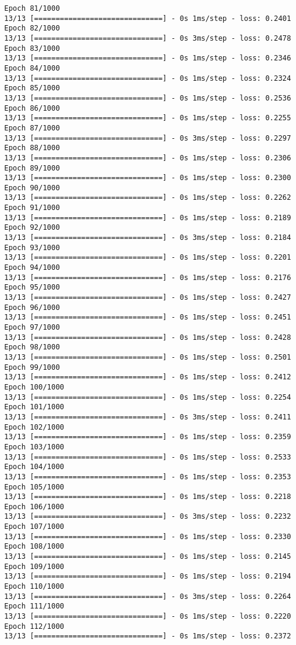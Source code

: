 \documentclass[11pt]{article}
\begin{document}
\begin{Verbatim}[commandchars=\\\{\}]
Epoch 81/1000
13/13 [==============================] - 0s 1ms/step - loss: 0.2401
Epoch 82/1000
13/13 [==============================] - 0s 3ms/step - loss: 0.2478
Epoch 83/1000
13/13 [==============================] - 0s 1ms/step - loss: 0.2346
Epoch 84/1000
13/13 [==============================] - 0s 1ms/step - loss: 0.2324
Epoch 85/1000
13/13 [==============================] - 0s 1ms/step - loss: 0.2536
Epoch 86/1000
13/13 [==============================] - 0s 1ms/step - loss: 0.2255
Epoch 87/1000
13/13 [==============================] - 0s 3ms/step - loss: 0.2297
Epoch 88/1000
13/13 [==============================] - 0s 1ms/step - loss: 0.2306
Epoch 89/1000
13/13 [==============================] - 0s 1ms/step - loss: 0.2300
Epoch 90/1000
13/13 [==============================] - 0s 1ms/step - loss: 0.2262
Epoch 91/1000
13/13 [==============================] - 0s 1ms/step - loss: 0.2189
Epoch 92/1000
13/13 [==============================] - 0s 3ms/step - loss: 0.2184
Epoch 93/1000
13/13 [==============================] - 0s 1ms/step - loss: 0.2201
Epoch 94/1000
13/13 [==============================] - 0s 1ms/step - loss: 0.2176
Epoch 95/1000
13/13 [==============================] - 0s 1ms/step - loss: 0.2427
Epoch 96/1000
13/13 [==============================] - 0s 1ms/step - loss: 0.2451
Epoch 97/1000
13/13 [==============================] - 0s 1ms/step - loss: 0.2428
Epoch 98/1000
13/13 [==============================] - 0s 1ms/step - loss: 0.2501
Epoch 99/1000
13/13 [==============================] - 0s 1ms/step - loss: 0.2412
Epoch 100/1000
13/13 [==============================] - 0s 1ms/step - loss: 0.2254
Epoch 101/1000
13/13 [==============================] - 0s 3ms/step - loss: 0.2411
Epoch 102/1000
13/13 [==============================] - 0s 1ms/step - loss: 0.2359
Epoch 103/1000
13/13 [==============================] - 0s 1ms/step - loss: 0.2533
Epoch 104/1000
13/13 [==============================] - 0s 1ms/step - loss: 0.2353
Epoch 105/1000
13/13 [==============================] - 0s 1ms/step - loss: 0.2218
Epoch 106/1000
13/13 [==============================] - 0s 3ms/step - loss: 0.2232
Epoch 107/1000
13/13 [==============================] - 0s 1ms/step - loss: 0.2330
Epoch 108/1000
13/13 [==============================] - 0s 1ms/step - loss: 0.2145
Epoch 109/1000
13/13 [==============================] - 0s 1ms/step - loss: 0.2194
Epoch 110/1000
13/13 [==============================] - 0s 3ms/step - loss: 0.2264
Epoch 111/1000
13/13 [==============================] - 0s 1ms/step - loss: 0.2220
Epoch 112/1000
13/13 [==============================] - 0s 1ms/step - loss: 0.2372

\end{Verbatim}
\end{document}

